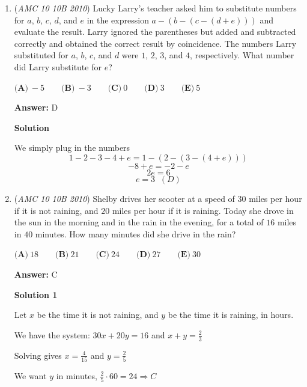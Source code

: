 \begin{enumerate}
Since the price of one ticket is a whole number, it must be a divisor of both $48$ and $64$. An integer is a common divisor of two numbers if and only if it is divisible by their difference. Hence, all the possible prices are positive divisors of $16$, or $1$, $2$, $4$, $8$, and $16$, making the answer $5$, or E. - By Monkey\_King

 


	\item (\textit{AMC 10 10B 2010}) Lucky Larry's teacher asked him to substitute numbers for $a$, $b$, $c$, $d$, and $e$ in the expression $a-(b-(c-(d+e)))$ and evaluate the result. Larry ignored the parentheses but added and subtracted correctly and obtained the correct result by coincidence. The numbers Larry substituted for $a$, $b$, $c$, and $d$ were $1$, $2$, $3$, and $4$, respectively. What number did Larry substitute for $e$?


 $\textbf{(A)}\ -5 \qquad \textbf{(B)}\ -3 \qquad \textbf{(C)}\ 0 \qquad \textbf{(D)}\ 3 \qquad \textbf{(E)}\ 5$

 \textbf{Answer: }D



\textbf{Solution}

We simply plug in the numbers
 \[1 - 2 - 3 - 4 + e = 1 - (2 - (3 - (4 + e)))\]
 \[-8 + e = -2 - e\]
 \[2e = 6\]
 \[e = 3 \;\;(D)\]



	\item (\textit{AMC 10 10B 2010}) Shelby drives her scooter at a speed of $30$ miles per hour if it is not raining, and $20$ miles per hour if it is raining. Today she drove in the sun in the morning and in the rain in the evening, for a total of $16$ miles in $40$ minutes. How many minutes did she drive in the rain?


 $\textbf{(A)}\ 18 \qquad \textbf{(B)}\ 21 \qquad \textbf{(C)}\ 24 \qquad \textbf{(D)}\ 27 \qquad \textbf{(E)}\ 30$

 \textbf{Answer: }C



\textbf{Solution 1}

Let $x$ be the time it is not raining, and $y$ be the time it is raining, in hours.

 We have the system: $30x+20y=16$ and $x+y=\frac{2}{3}$

 Solving gives $x=\frac{4}{15}$ and $y=\frac{2}{5}$

 We want $y$ in minutes, $\frac{2}{5} \cdot 60=24 \Rightarrow C$





\end{enumerate}
